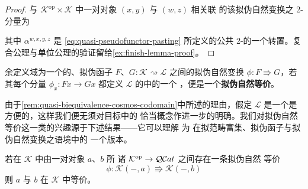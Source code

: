 \begin{proof}
与 $\mathcal{K}^{\mathrm{op}}\times\mathcal{K}$ 中一对对象 $(x,y)$ 与 $(w,z)$ 相关联
的该拟伪自然变换之 2-\trCell{}分量为
\begin{center}
\end{center}
其中 $\alpha^{w,x,y,z}$ 是 \eqref{eq:quasi-pseudofunctor-pasting} 所定义的公共
2-\trCell{}的一个转置。复合公理与单位公理的验证留给\cref{ex:finish-lemma-proof}。
\end{proof}

\begin{definition}\label{def:quasi-pseudonatural-equivalence}
余定义域为一个\trInfinityCosmos{}的、拟伪函子 $F$、$G\colon\mathcal{K}\rightsquigarrow\mathcal{L}$
之间的拟伪自然变换 $\phi\colon F\Rrightarrow G$，若其每个分量
$\phi_{x}\colon Fx\to Gx$ 都定义 $\mathcal{L}$ 的\trHomotopyTwoCategory{}中的一个%
\trEquivalence，便是一个\textbf{拟伪自然等价}。
\end{definition}

由于\cref{rem:quasi-biequivalence-cosmos-codomain}中所述的理由，假定 $\mathcal{L}$
是一个\trInfinityCosmos{}是方便的，这样我们便无须对目标\trCategory{}中\trEquivalence{}的
恰当概念作进一步的明确。我们对拟伪自然等价这一类的兴趣源于下述结果——它可以理解
为\trBicategory{} \trYonedaLemma{}在拟范畴富集\trCategory、拟伪函子与拟伪自然变换之语境中的
一个版本。

\begin{lemma}\label{lem:quasi-yoneda}
若在\trInfinityCosmos{} $\mathcal{K}$ 中由一对对象 $a$、$b$ 所\trRepresentable{}%
诸\trSimplicialFunctor{} $\mathcal{K}^{\mathrm{op}}\to\mathcal{Q}\mathcal{C}at{}$ 之间存在一条拟伪自然
等价
\begin{equation*}
\phi\colon\mathcal{K}(-,a)\Rrightarrow\mathcal{K}(-,b)
\end{equation*}
则 $a$ 与 $b$ 在 $\mathcal{K}$ 中等价。
\end{lemma}


